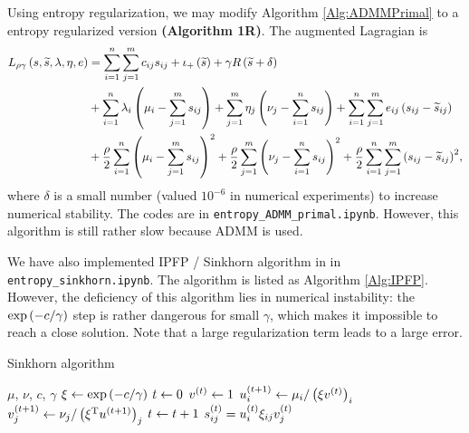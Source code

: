 \documentclass[english]{pkupaper}
\begin{document}
Using entropy regularization, we may modify Algorithm \ref{Alg:ADMMPrimal} to a entropy regularized version \textbf{(Algorithm \hypertarget{EAlg:1R}{1R})}. The augmented Lagragian is
\begin{equation}
\begin{aligned}
L_{ \rho \gamma } \left(  s, \widetilde{s}, \lambda, \eta, e  \right) &= \sum_{ {i} = {1} }^{n}{\sum_{ {j} = {1} }^{m}{ c_{ i j } s_{ i j } }} + \iota_+ \left( \widetilde{s} \right) + \gamma R \left(  \widetilde{s} + \delta  \right) \\
&+ \sum_{ {i} = {1} }^{n}{ \lambda_i \left(  \mu_i - \sum_{ {j} = {1} }^{m}{s_{ i j }}  \right) } + \sum_{ {j} = {1} }^{m}{ \eta_j \left(  \nu_j - \sum_{ {i} = {1} }^{n}{s_{ i j }}  \right) } + \sum_{ {i} = {1} }^{n}{\sum_{ {j} = {1} }^{m}{ e_{ i j } \left(  s_{ i j } - \widetilde{s}_{ i j }  \right) }} \\
&+ \frac{\rho}{2} \sum_{ {i} = {1} }^{n}{\left(  \mu_i - \sum_{ {j} = {1} }^{m}{s_{ i j }}  \right)^2} + \frac{\rho}{2} \sum_{ {j} = {1} }^{m}{\left(  \nu_j - \sum_{ {i} = {1} }^{n}{s_{ i j }}  \right)^2} + \frac{\rho}{2} \sum_{ {i} = {1} }^{n}{\sum_{ {j} = {1} }^{m}{\left(  s_{ i j } - \widetilde{s}_{ i j }  \right)^2}}, \\
\end{aligned}
\end{equation}
where $\delta$ is a small number (valued $10^{-6}$ in numerical experiments) to increase numerical stability. The codes are in \verb"entropy_ADMM_primal.ipynb". However, this algorithm is still rather slow because ADMM is used.

We have also implemented IPFP / Sinkhorn algorithm in \parencite{Benamou2015} in \verb"entropy_sinkhorn.ipynb". The algorithm is listed as Algorithm \ref{Alg:IPFP}. However, the deficiency of this algorithm lies in numerical instability: the $ \exp \left(  -c / \gamma  \right) $ step is rather dangerous for small $\gamma$, which makes it impossible to reach a close solution. Note that a large regularization term leads to a large error.

\begin{algorithm}
\caption{Sinkhorn algorithm}
\label{Alg:IPFP}
\begin{algorithmic}
\REQUIRE $\mu$, $\nu$, $c$, $\gamma$
\STATE $ \xi \leftarrow \exp \left(  -c / \gamma  \right) $
\STATE $ t \leftarrow 0 $
\STATE $ v^{\left( t \right)} \leftarrow 1 $
\STATE $ u^{\left(  t + 1  \right)}_i \leftarrow \mu_i / \left(  \xi v^{\left( t \right)}  \right)_i $
\STATE $ v^{\left(  t + 1  \right)}_j \leftarrow \nu_j / \left(  \xi^{\mathrm{T}} u^{\left(  t + 1  \right)}  \right)_j $
\STATE $ t \leftarrow t + 1 $
\ENDWHILE
\STATE $s^{\left( t \right)}_{ i j } = u^{\left( t \right)}_i \xi_{ i j } v^{\left( t \right)}_j $
\end{algorithmic}
\end{algorithm}

	
\end{document}

